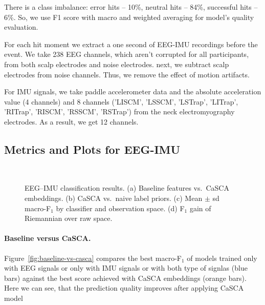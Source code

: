\documentclass[14pt]{extarticle}
\begin{document}
		
	There is a class imbalance: error hits -- 10\%, neutral hits -- 84\%, successful hits -- 6\%. So, we use F1 score with macro and weighted averaging for model's quality evaluation.
	
	For each hit moment we extract a one second of EEG-IMU recordings before the event. We take 238 EEG channels, which aren't corrupted for all participants, from both scalp electrodes and noise electrodes.
	next, we subtract scalp electrodes from noise channels. Thus, we remove the effect of motion artifacts.
	
	For IMU signals, we take paddle accelerometer data and the absolute acceleration value (4 channels) and 8 channels ('LISCM', 'LSSCM', 'LSTrap', 'LITrap', 'RITrap', 'RISCM', 'RSSCM', 'RSTrap') from the neck electromyography electrodes. As a result, we get 12 channels.
	
	\subsection{Metrics and Plots for EEG-IMU}
	
	\begin{figure}[bhtp]
		\centering
		\\
		\caption{EEG–IMU classification results.  
			(a) Baseline features vs.\ CaSCA embeddings.  
			(b) CaSCA vs.\ naive label priors.  
			(c) Mean $\pm$ sd macro-F$_1$ by classifier and observation space.  
			(d) F$_1$ gain of Riemannian over raw space.}
			\label{fig:eeg_imu_results}
	\end{figure}
	
	\paragraph{Baseline versus CaSCA.}
	Figure~\ref{fig:baseline-vs-casca} compares the best
	macro-F$_1$ of models trained only with EEG signals or only with IMU signals or with both type of signlas (blue bars) against the
	best score achieved with CaSCA embeddings (orange bars). Here we can see, that the prediction quality improves after applying CaSCA model 
	
\end{document}
